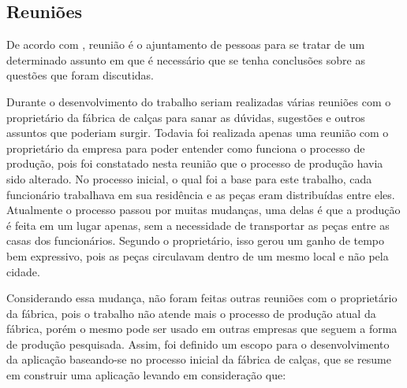 \subsection{Reuniões}  \label{reunioes}
\par De acordo com , reunião é o ajuntamento de
pessoas para se tratar de um determinado assunto em que é necessário que se
tenha conclusões sobre as questões que foram discutidas.

\par Durante o desenvolvimento do trabalho seriam realizadas várias reuniões
com o proprietário da fábrica de calças para sanar as dúvidas, sugestões e
outros assuntos que poderiam surgir. Todavia foi realizada apenas uma reunião com o proprietário
da empresa para poder entender como funciona o processo de produção, pois foi constatado nesta reunião que o
processo de produção havia sido alterado. No processo inicial, o qual foi a base
para este trabalho, cada funcionário trabalhava em sua residência e as peças eram distribuídas entre eles. Atualmente o processo
passou por muitas mudanças, uma delas é que a produção é feita em um lugar
apenas, sem a necessidade de transportar as peças entre as casas dos
funcionários. Segundo o proprietário, isso gerou um ganho de tempo bem
expressivo, pois as peças circulavam dentro de um mesmo local e não pela cidade. 

\par Considerando essa mudança, não foram feitas outras reuniões com o
proprietário da fábrica, pois o trabalho não atende mais o processo de produção
atual da fábrica, porém o mesmo pode ser usado em outras empresas que seguem a
forma de produção pesquisada. Assim, foi definido um escopo para o desenvolvimento da aplicação baseando-se no 
processo inicial da fábrica de calças, que se resume em construir uma aplicação levando em consideração que:

